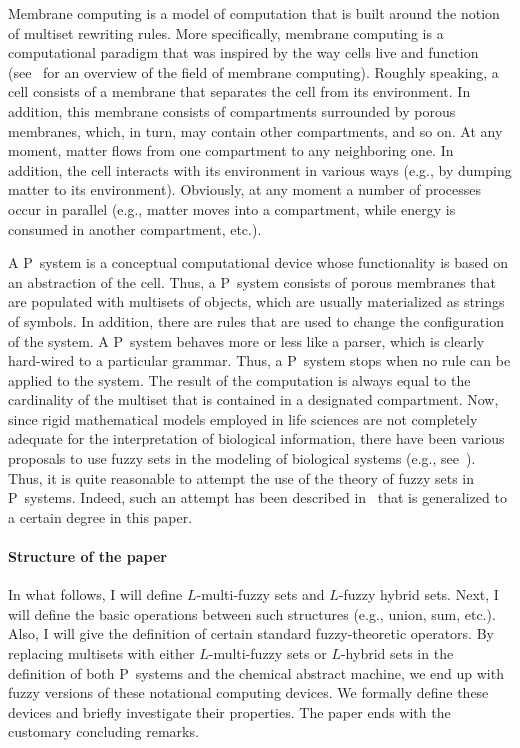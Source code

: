 \documentclass{amsart}
\theoremstyle{definition}
\begin{document}
Membrane computing is a model of computation that is built around 
the notion of multiset rewriting rules. More specifically, membrane computing 
is a computational paradigm that  was inspired by the way cells live and 
function (see~\cite{paun02} for an overview of the field of membrane 
computing). Roughly speaking, a cell consists of a membrane that separates the
cell from its environment. In addition, this membrane consists 
of compartments surrounded by porous membranes, which, in turn, may contain other 
compartments, and so on. At any moment, matter flows from one compartment to 
any neighboring one. In addition, the cell interacts with its environment in 
various ways (e.g., by dumping matter to its environment). Obviously, at any 
moment a number of processes occur in parallel (e.g., matter moves into a 
compartment, while energy is consumed in another compartment, etc.).

A P~system is a conceptual computational device whose functionality is based on an 
abstraction of the cell. Thus, a P~system consists of porous membranes that are 
populated with multisets of objects, which are usually materialized as strings
of symbols. In addition, there are rules that are used to change the 
configuration of the system. A P~system behaves more or less like a parser, 
which is clearly hard-wired to a particular grammar. Thus, a P~system stops 
when no rule can be applied to the system. The result of the computation is 
always equal to the cardinality of the multiset that is contained in a 
designated compartment. Now, since rigid mathematical models employed in life 
sciences are not completely adequate for the interpretation of biological 
information, there have been various proposals to use fuzzy sets in the 
modeling of biological systems (e.g., see~\cite{akay97,baum98}). Thus, it is 
quite reasonable to attempt the use of the theory of fuzzy sets in P~systems. 
Indeed, such an attempt has been described in~\cite{syropoulos06} that
is generalized to a certain degree in this paper.

\paragraph{Structure of the paper} In what follows, I will define 
$L$-multi-fuzzy sets and $L$-fuzzy hybrid sets. Next, I will define the basic 
operations between such structures (e.g., union, sum, etc.). Also, I  will 
give the definition of certain  standard fuzzy-theoretic operators. By
replacing multisets with either $L$-multi-fuzzy sets or $L$-hybrid sets in the
definition of both P~systems and the chemical abstract machine, we end up with
fuzzy versions of these notational computing devices. We formally define
these devices and briefly investigate their properties. The paper ends 
with the customary concluding remarks.
\end{document}
